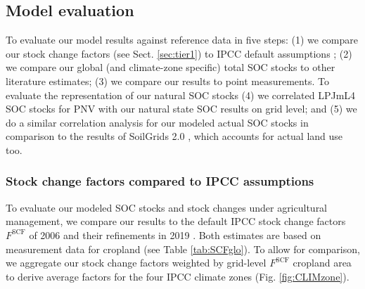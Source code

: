 \documentclass[gc, manuscript]{copernicus}
\begin{document}
\hypertarget{sec:validate}{%
\subsection{Model evaluation}\label{sec:validate}}

To evaluate our model results against reference data in five steps: (1) we compare our stock change factors (see Sect. \ref{sec:tier1}) to IPCC default assumptions \citep{lasco_cropland_in_ipcc_2006, ogle_cropland_in_ipcc_2019}; (2) we compare our global (and climate-zone specific) total SOC stocks to other literature estimates; (3) we compare our results to point measurements. To evaluate the representation of our natural SOC stocks (4) we correlated LPJmL4 SOC stocks for PNV with our natural state SOC results on grid level; and (5) we do a similar correlation analysis for our modeled actual SOC stocks in comparison to the results of SoilGrids 2.0 \citep{poggio_soilgrids_2021}, which accounts for actual land use too.

\hypertarget{sec:ipcccompare}{%
\subsubsection{Stock change factors compared to IPCC assumptions}\label{sec:ipcccompare}}

To evaluate our modeled SOC stocks and stock changes under agricultural management, we compare our results to the default IPCC stock change factors \(F^{\mathrm{SCF}}\) of 2006 \citep{lasco_cropland_in_ipcc_2006} and their refinements in 2019 \citep{ogle_cropland_in_ipcc_2019}. Both estimates are based on measurement data for cropland (see Table \ref{tab:SCFglo}). To allow for comparison, we aggregate our stock change factors weighted by grid-level \(F^{\mathrm{SCF}}\) cropland area to derive average factors for the four IPCC climate zones (Fig. \ref{fig:CLIMzone}).
\end{document}
